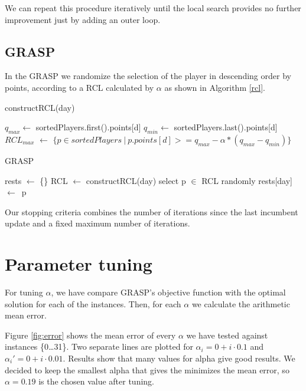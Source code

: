 \documentclass[a4paper, 10pt]{article}
\begin{document}
We can repeat this procedure iteratively until the local search provides no further improvement just by adding an outer loop.


\clearpage
\subsection{GRASP}

In the GRASP we randomize the selection of the player in descending order by points, according to a RCL calculated by $\alpha$ as shown in Algorithm \ref{rcl}.


\begin{algorithm}
    \caption{constructRCL(day)} 
    \label{rcl}
    \begin{algorithmic}[1]
	\State $q_{max} \leftarrow $ sortedPlayers.first().points[d]
	\State $q_{min} \leftarrow$ sortedPlayers.last().points[d]
	\State $RCL_{max}$ $\leftarrow$ $\{p \in sortedPlayers\ |\ p.points[d] >= q_{max} - \alpha * (q_{max} - q_{min})\}$
    \end{algorithmic} 
\end{algorithm}




\begin{algorithm}
	\caption{GRASP} 
	\begin{algorithmic}[1]
	  \State rests $\leftarrow$ \{\}
	      \State RCL $\leftarrow$ constructRCL(day)
	      \State select p $\in$ RCL randomly
	      \State rests[day]\ $\leftarrow$\ p
	    \EndFor
	\end{algorithmic} 
\end{algorithm}

Our stopping criteria combines the number of iterations since the last incumbent update and a fixed maximum number of iterations.


\section{Parameter tuning} 

For tuning $\alpha$, we have compare GRASP's objective function with the optimal solution for each of the instances. Then, for each $\alpha$ we calculate the arithmetic mean error. 

Figure \ref{fig:error} shows the mean error of every $\alpha$ we have tested against instances \{0\dots31\}. Two separate lines are plotted for $\alpha_i = 0 + i \cdot 0.1$ and $\alpha_i' = 0 + i \cdot 0.01$. Results show that many values for alpha give good results. We decided to keep the smallest alpha that gives the minimizes the mean error, so $\alpha = 0.19$ is the chosen value after tuning.
\end{document}
